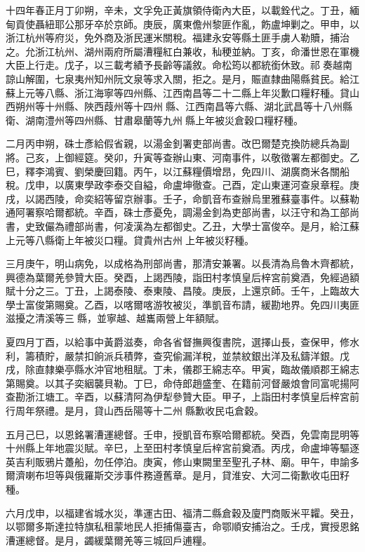 \begin{pinyinscope}
十四年春正月丁卯朔，辛未，文孚免正黃旗領侍衛內大臣，以載銓代之。丁丑，緬甸貢使聶紐耶公那牙卒於京師。庚辰，廣東儋州黎匪作亂，飭盧坤剿之。甲申，以浙江杭州等府災，免外商及浙民運米關稅。福建永安等縣土匪手虜人勒贖，捕治之。允浙江杭州、湖州兩府所屬漕糧紅白兼收，秈稉並納。丁亥，命潘世恩在軍機大臣上行走。戊子，以三載考績予長齡等議敘。命松筠以都統銜休致。祁奏越南諒山解圍，七泉夷州知州阮文泉等求入關，拒之。是月，賑直隸曲陽縣貧民。給江蘇上元等八縣、浙江海寧等四州縣、江西南昌等二十二縣上年災歉口糧籽種。貸山西朔州等十州縣、陜西葭州等十四州縣、江西南昌等六縣、湖北武昌等十八州縣衛、湖南澧州等四州縣、甘肅皋蘭等九州縣上年被災倉穀口糧籽種。

二月丙申朔，硃士彥給假省親，以湯金釗署吏部尚書。改巴爾楚克換防總兵為副將。己亥，上御經筵。癸卯，升寅等查辦山東、河南事件，以敬徵署左都御史。乙巳，釋李鴻賓、劉榮慶回籍。丙午，以江蘇糧價增昂，免四川、湖廣商米各關船稅。戊申，以廣東學政李泰交自縊，命盧坤徹查。己酉，定山東運河查泉章程。庚戌，以謁西陵，命奕紹等留京辦事。壬子，命凱音布查辦烏里雅蘇臺事件。以蘇勒通阿署察哈爾都統。辛酉，硃士彥憂免，調湯金釗為吏部尚書，以汪守和為工部尚書，史致儼為禮部尚書，何凌漢為左都御史。乙丑，大學士富俊卒。是月，給江蘇上元等八縣衛上年被災口糧。貸貴州古州上年被災籽種。

三月庚午，明山病免，以成格為刑部尚書，那清安兼署。以長清為烏魯木齊都統，興德為葉爾羌參贊大臣。癸酉，上謁西陵，詣田村孝慎皇后梓宮前奠酒，免經過額賦十分之三。丁丑，上謁泰陵、泰東陵、昌陵。庚辰，上還京師。壬午，上臨故大學士富俊第賜奠。乙酉，以喀爾喀游牧被災，準凱音布請，緩勘地界。免四川夷匪滋擾之清溪等三縣，並寧越、越巂兩營上年額賦。

夏四月丁酉，以給事中黃爵滋奏，命各省督撫興復書院，選擇山長，查保甲，修水利，籌積貯，嚴禁扣餉派兵積弊，查究偷漏洋稅，並禁紋銀出洋及私鑄洋銀。戊戌，除直隸樂亭縣水沖官地租賦。丁未，儀郡王綿志卒。甲寅，臨故儀順郡王綿志第賜奠。以其子奕絪襲貝勒。丁巳，命侍郎趙盛奎、在籍前河督嚴烺會同富呢揚阿查勘浙江塘工。辛酉，以蘇清阿為伊犁參贊大臣。甲子，上詣田村孝慎皇后梓宮前行周年祭禮。是月，貸山西岳陽等十二州縣歉收民屯倉穀。

五月己巳，以恩銘署漕運總督。壬申，授凱音布察哈爾都統。癸酉，免雲南昆明等十州縣上年地震災賦。辛巳，上至田村孝慎皇后梓宮前奠酒。丙戌，命盧坤等驅逐英吉利販鴉片躉船，勿任停泊。庚寅，修山東闕里至聖孔子林、廟。甲午，申諭多爾濟喇布坦等與俄羅斯交涉事件務遵舊章。是月，貸淮安、大河二衛歉收屯田籽種。

六月戊申，以福建省城水災，準運古田、福清二縣倉穀及廈門商販米平糶。癸丑，以鄂爾多斯達拉特旗私租蒙地民人拒捕傷臺吉，命鄂順安捕治之。壬戌，實授恩銘漕運總督。是月，蠲緩葉爾羌等三城回戶逋糧。


\end{pinyinscope}
